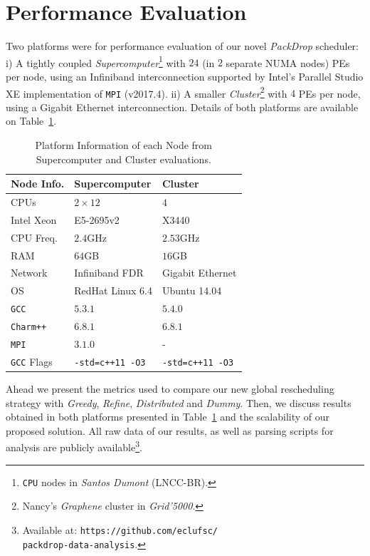 \section{Performance Evaluation} \label{sec:eval}

Two platforms were for performance evaluation of our novel \textit{PackDrop} scheduler:
i) A tightly coupled \textit{Supercomputer}\footnote{\texttt{CPU} nodes in \textit{Santos Dumont} (LNCC-BR).} with $24$ (in $2$ separate NUMA nodes) PEs per node, using an Infiniband interconnection supported by Intel's Parallel Studio XE implementation of \texttt{MPI} (v2017.4).
ii) A smaller \textit{Cluster}\footnote{Nancy's \textit{Graphene} cluster in \textit{Grid'5000}.} with $4$ PEs per node, using a Gigabit Ethernet interconnection.
Details of both platforms are available on Table~\ref{tab:ptinfo}.

\begin{table}[ht]
    \centering
    \caption{Platform Information of each Node from Supercomputer and Cluster evaluations.}
	\begin{tabular}{l|l|l}
	Node Info.	 		& Supercomputer 		& Cluster \\ \hline
        CPUs	   			& $2\times12$ 			& $4$ \\
        Intel Xeon			& E5-2695v2 			& X3440\\
        CPU Freq.  			& $2.4$GHz   			& $2.53$GHz\\
        RAM        			& $64$GB			& $16$GB\\
        Network 			& Infiniband FDR 		& Gigabit Ethernet\\
        OS      			& RedHat Linux 6.4 		& Ubuntu 14.04\\
        \texttt{GCC}			& $5.3.1$			& $5.4.0$\\
        \texttt{Charm++} 		& $6.8.1$ 			& $6.8.1$\\
        \texttt{MPI}			& $3.1.0$			& -\\
        \texttt{GCC} Flags		& \texttt{-std=c++11 -O3} 	& \texttt{-std=c++11 -O3} \\
	\end{tabular}
    \label{tab:ptinfo}
\end{table}

Ahead we present the metrics used to compare our new global rescheduling strategy with \textit{Greedy}, \textit{Refine}, \textit{Distributed} and \textit{Dummy}.   
Then, we discuss results obtained in both platforms presented in Table~\ref{tab:ptinfo} and the scalability of our proposed solution.
All raw data of our results, as well as parsing scripts for analysis are publicly available\footnote{Available at: \texttt{https://github.com/eclufsc/\\packdrop-data-analysis}.}.

